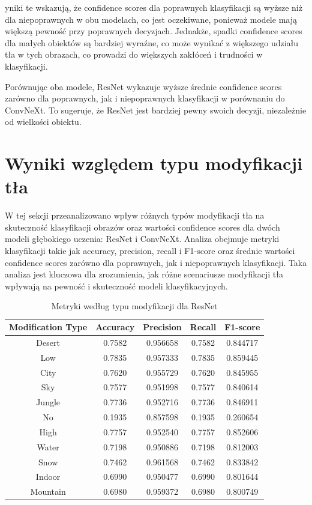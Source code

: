 yniki te wskazują, że confidence scores dla poprawnych klasyfikacji są wyższe niż dla niepoprawnych w obu modelach, co jest oczekiwane, 
ponieważ modele mają większą pewność przy poprawnych decyzjach. Jednakże, spadki confidence scores dla małych obiektów są bardziej wyraźne, 
co może wynikać z większego udziału tła w tych obrazach, co prowadzi do większych zakłóceń i trudności w klasyfikacji.

Porównując oba modele, ResNet wykazuje wyższe średnie confidence scores zarówno dla poprawnych, jak i niepoprawnych klasyfikacji w porównaniu 
do ConvNeXt. To sugeruje, że ResNet jest bardziej pewny swoich decyzji, niezależnie od wielkości obiektu.

\section*{Wyniki względem typu modyfikacji tła}

W tej sekcji przeanalizowano wpływ różnych typów modyfikacji tła na skuteczność klasyfikacji obrazów oraz wartości confidence scores dla dwóch 
modeli głębokiego uczenia: ResNet i ConvNeXt. Analiza obejmuje metryki klasyfikacji takie jak accuracy, precision, recall i F1-score oraz 
średnie wartości confidence scores zarówno dla poprawnych, jak i niepoprawnych klasyfikacji. Taka analiza jest kluczowa dla zrozumienia, jak 
różne scenariusze modyfikacji tła wpływają na pewność i skuteczność modeli klasyfikacyjnych.

\begin{table}
	\centering
	\begin{tabular}{|c|c|c|c|c|}
		\hline
		\textbf{Modification Type} & \textbf{Accuracy} & \textbf{Precision} & \textbf{Recall} & \textbf{F1-score} \\
		\hline
		Desert & 0.7582 & 0.956658 & 0.7582 & 0.844717 \\
		\hline
		Low & 0.7835 & 0.957333 & 0.7835 & 0.859445 \\
		\hline
		City & 0.7620 & 0.955729 & 0.7620 & 0.845955 \\
		\hline
		Sky & 0.7577 & 0.951998 & 0.7577 & 0.840614 \\
		\hline
		Jungle & 0.7736 & 0.952716 & 0.7736 & 0.846911 \\
		\hline
		No & 0.1935 & 0.857598 & 0.1935 & 0.260654 \\
		\hline
		High & 0.7757 & 0.952540 & 0.7757 & 0.852606 \\
		\hline
		Water & 0.7198 & 0.950886 & 0.7198 & 0.812003 \\
		\hline
		Snow & 0.7462 & 0.961568 & 0.7462 & 0.833842 \\
		\hline
		Indoor & 0.6990 & 0.950477 & 0.6990 & 0.801644 \\
		\hline
		Mountain & 0.6980 & 0.959372 & 0.6980 & 0.800749 \\
		\hline
	\end{tabular}
	\caption{Metryki według typu modyfikacji dla ResNet}
	\label{tab:resnet_metrics_modification}
\end{table}

